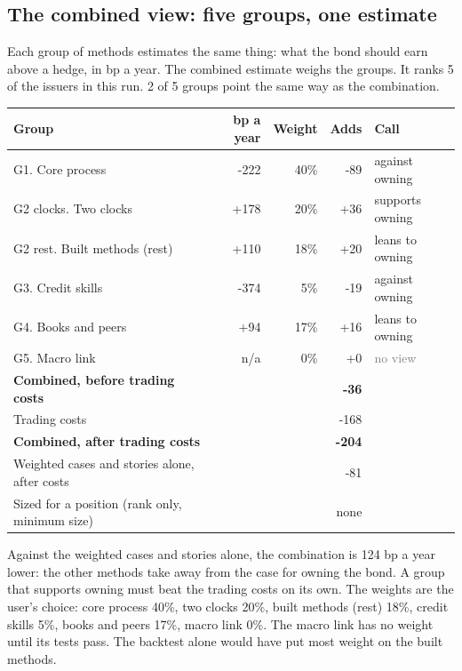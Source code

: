 \documentclass[11pt,a4paper]{article}
\begin{document}
\subsection*{The combined view: five groups, one estimate}
Each group of methods estimates the same thing: what the bond should earn above a hedge, in bp a year. The combined estimate weighs the groups. It ranks 5 of the issuers in this run. 2 of 5 groups point the same way as the combination.
\begin{center}\footnotesize\setlength{\tabcolsep}{3.5pt}\begin{tabular}{@{}lrrrl@{}}\toprule
Group & bp a year & Weight & Adds & Call \\\midrule
G1. Core process & -222 & 40\% & -89 & \textcolor{bad}{against owning} \\
G2 clocks. Two clocks & +178 & 20\% & +36 & \textcolor{good}{supports owning} \\
G2 rest. Built methods (rest) & +110 & 18\% & +20 & \textcolor{amber}{leans to owning} \\
G3. Credit skills & -374 & 5\% & -19 & \textcolor{bad}{against owning} \\
G4. Books and peers & +94 & 17\% & +16 & \textcolor{amber}{leans to owning} \\
G5. Macro link & n/a & 0\% & +0 & \textcolor{gray}{no view} \\
\textbf{Combined, before trading costs} &  &  & \textbf{-36} &  \\
Trading costs &  &  & -168 &  \\
\textbf{Combined, after trading costs} &  &  & \textbf{-204} &  \\
Weighted cases and stories alone, after costs &  &  & -81 &  \\
Sized for a position (rank only, minimum size) &  &  & none &  \\
\bottomrule\end{tabular}\end{center}
Against the weighted cases and stories alone, the combination is 124 bp a year lower: the other methods take away from the case for owning the bond. A group that supports owning must beat the trading costs on its own. The weights are the user's choice: core process 40\%, two clocks 20\%, built methods (rest) 18\%, credit skills 5\%, books and peers 17\%, macro link 0\%. The macro link has no weight until its tests pass. The backtest alone would have put most weight on the built methods.
\par\noindent{}
\end{document}
